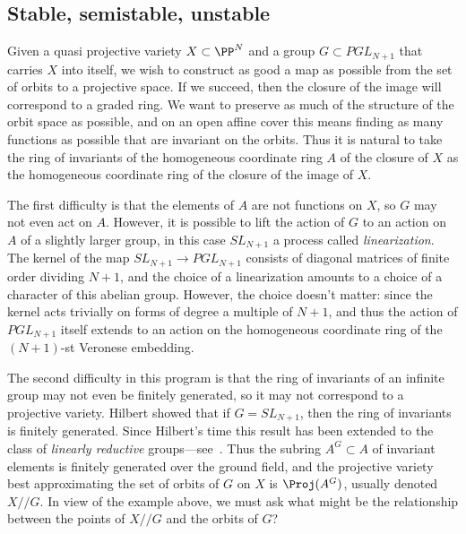 %
%


\subsection{Stable, semistable, unstable}

Given a quasi projective variety $X \subset \PP^N$ and a group $G \subset PGL_{N+1}$ that carries $X$ into itself, we wish to construct as good a map as possible from the set of orbits
to a projective space. If we succeed, then the closure of the
image will correspond to a graded ring. We want to preserve as much of the structure of the orbit space as possible, and on an open affine cover
this means finding as many functions as possible that are invariant on the orbits. Thus it is natural to take the ring of invariants
of the homogeneous coordinate ring $A$ of the closure of $X$ as the homogeneous coordinate ring of the closure
of the image of $X$. 

The first difficulty is that the elements of $A$ are not functions on $X$, so $G$ may not even act on $A$. However, 
it is possible to lift the action of $G$ to an action on $A$ of a slightly larger group, in this case
$SL_{N+1}$ a process called \emph{linearization}. The kernel of the map $SL_{N+1} \to PGL_{N+1}$ consists of diagonal matrices of finite order dividing $N+1$, and the choice of
a linearization amounts to a choice of a character of this abelian group. However, the choice doesn't matter: since the kernel acts trivially on forms of degree a multiple
of $N+1$, and thus the action of $PGL_{N+1}$ itself  extends to an action on the homogeneous coordinate ring of the $(N+1)$-st Veronese embedding. 

The second difficulty in this program is that the ring of invariants of an infinite group may not even be finitely generated,
so it may not correspond to a projective variety. Hilbert showed that if $G= SL_{N+1}$, then the ring of invariants
is finitely generated. Since Hilbert's time this result has been extended to the class of 
\emph{linearly reductive} groups---see~\cite{MR0382294}.
Thus the subring $A^G \subset A$ of invariant elements is finitely generated over the ground field, and the projective variety best approximating the set of orbits of $G$ on $X$ 
is $\Proj(A^G)$, usually denoted $X//G$. In view of the example above, we must ask what might be
the relationship between the points of $X//G$ and the orbits of $G$? 

